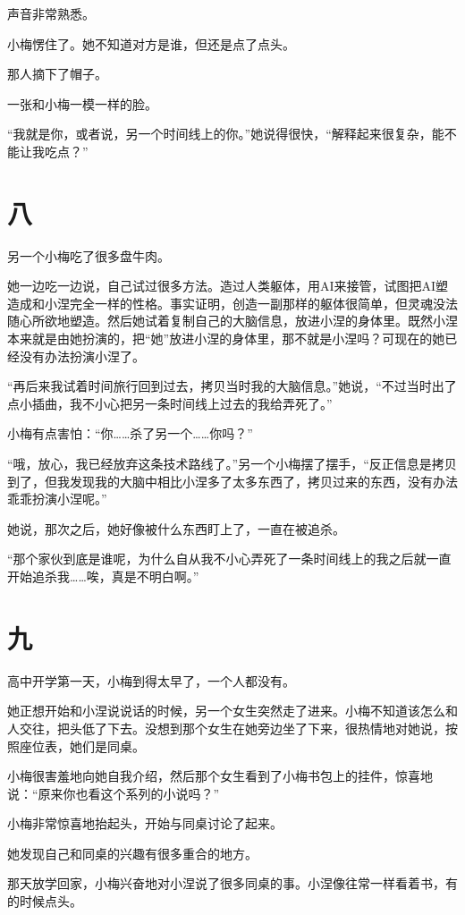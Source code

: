 \documentclass[12pt,a4paper]{ctexart}
\begin{document}
声音非常熟悉。

小梅愣住了。她不知道对方是谁，但还是点了点头。

那人摘下了帽子。

一张和小梅一模一样的脸。

“我就是你，或者说，另一个时间线上的你。”她说得很快，“解释起来很复杂，能不能让我吃点？”

\section{八}

另一个小梅吃了很多盘牛肉。

她一边吃一边说，自己试过很多方法。造过人类躯体，用AI来接管，试图把AI塑造成和小涅完全一样的性格。事实证明，创造一副那样的躯体很简单，但灵魂没法随心所欲地塑造。然后她试着复制自己的大脑信息，放进小涅的身体里。既然小涅本来就是由她扮演的，把“她”放进小涅的身体里，那不就是小涅吗？可现在的她已经没有办法扮演小涅了。

“再后来我试着时间旅行回到过去，拷贝当时我的大脑信息。”她说，“不过当时出了点小插曲，我不小心把另一条时间线上过去的我给弄死了。”

小梅有点害怕：“你……杀了另一个……你吗？”

“哦，放心，我已经放弃这条技术路线了。”另一个小梅摆了摆手，“反正信息是拷贝到了，但我发现我的大脑中相比小涅多了太多东西了，拷贝过来的东西，没有办法乖乖扮演小涅呢。”

她说，那次之后，她好像被什么东西盯上了，一直在被追杀。

“那个家伙到底是谁呢，为什么自从我不小心弄死了一条时间线上的我之后就一直开始追杀我……唉，真是不明白啊。”

\section{九}

高中开学第一天，小梅到得太早了，一个人都没有。

她正想开始和小涅说说话的时候，另一个女生突然走了进来。小梅不知道该怎么和人交往，把头低了下去。没想到那个女生在她旁边坐了下来，很热情地对她说，按照座位表，她们是同桌。

小梅很害羞地向她自我介绍，然后那个女生看到了小梅书包上的挂件，惊喜地说：“原来你也看这个系列的小说吗？”

小梅非常惊喜地抬起头，开始与同桌讨论了起来。

她发现自己和同桌的兴趣有很多重合的地方。

那天放学回家，小梅兴奋地对小涅说了很多同桌的事。小涅像往常一样看着书，有的时候点头。
\end{document}
